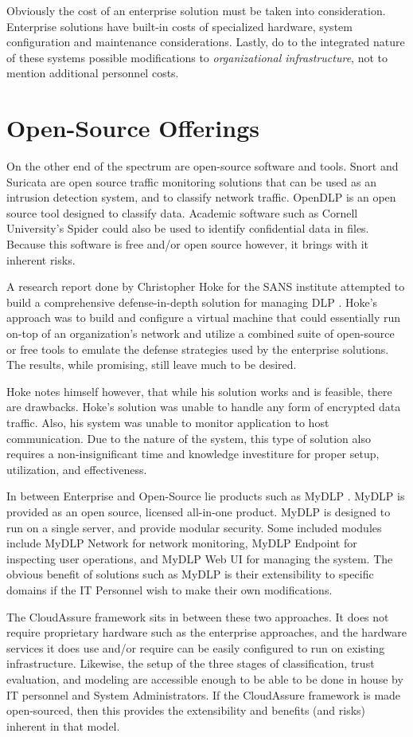 Obviously the cost
of an enterprise solution must be taken into consideration. Enterprise solutions
have built-in costs of specialized hardware, system configuration and
maintenance considerations. Lastly, do to the integrated nature of these systems possible modifications to 
\emph{organizational infrastructure}, not to mention additional personnel costs.

\section{Open-Source Offerings}
On the other end of
the spectrum are open-source software and tools. Snort \autocite{Parker2013} and
Suricata \autocite{Jonkman2013}
are open source traffic monitoring solutions that can be used as an intrusion
detection system, and to classify network traffic. OpenDLP \autocite{Gavin2012} is an open
source tool designed to classify data. Academic software such as Cornell
University's Spider \autocite{Cornell2013} could also be used to identify confidential data in
files. Because this software is free and/or open source however, it brings with
it inherent risks.  

A research report done by Christopher Hoke for the SANS
institute attempted to build a comprehensive defense-in-depth solution for
managing \gls{DLP} \autocite{Hoke2012}.  Hoke's approach was to build and configure a virtual
machine that could essentially run on-top of an organization's network and
utilize a combined suite of open-source or free tools to emulate the defense
strategies used by the enterprise solutions. The results, while promising, still
leave much to be desired.  

Hoke notes himself however, that while his solution
works and is feasible, there are drawbacks. Hoke's solution was unable to handle
any form of encrypted data traffic. Also, his system was unable to monitor
application to host communication. Due to the nature of the system, this type of
solution also requires a non-insignificant time and knowledge investiture for
proper setup, utilization, and effectiveness.  

In between Enterprise and
Open-Source lie products such as MyDLP \autocite{MyDLP2013}. MyDLP is provided as an open
source, licensed all-in-one product. MyDLP is designed to run on a single
server, and provide modular security. Some included modules include MyDLP
Network for network monitoring, MyDLP Endpoint for inspecting user operations,
and MyDLP Web UI for managing the system. The obvious benefit of solutions such
as MyDLP is their extensibility to specific domains if the IT Personnel wish to
make their own modifications.  

The CloudAssure framework sits in between these
two approaches. It does not require proprietary hardware such as the enterprise
approaches, and the hardware services it does use and/or require can be easily
configured to run on existing infrastructure. Likewise, the setup of the three stages of
classification, trust evaluation, and modeling are accessible enough to be able
to be done in house by IT personnel and System Administrators. If the
CloudAssure framework is made open-sourced, then this provides the extensibility
and benefits (and risks) inherent in that model. 

